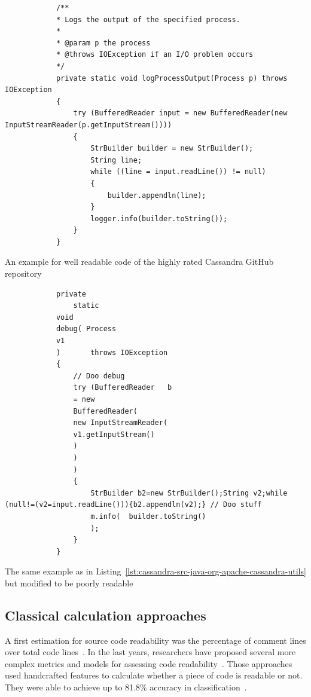 \documentclass[%
class=scrreprt,
chapterprefix=false,%
open=right,%
twoside=false,%
paper=a4,%
logofile={Logo\_zentral\_farbig\_EN.png},%
thesistype=masterproposal,%
UKenglish,%
]{se2thesis}
\begin{document}
	\begin{listing}[!ht]
		\begin{verbatim}
			/**
			* Logs the output of the specified process.
			*
			* @param p the process
			* @throws IOException if an I/O problem occurs
			*/
			private static void logProcessOutput(Process p) throws IOException
			{
				try (BufferedReader input = new BufferedReader(new InputStreamReader(p.getInputStream())))
				{
					StrBuilder builder = new StrBuilder();
					String line;
					while ((line = input.readLine()) != null)
					{
						builder.appendln(line);
					}
					logger.info(builder.toString());
				}
			}
		\end{verbatim}
		\caption[An example for well readable code of the highly rated Cassandra GitHub repository]{An example for well readable code of the highly rated Cassandra GitHub repository}
		\label{lst:cassandra-src-java-org-apache-cassandra-utils}
	\end{listing}
	
	\begin{listing}[!ht]
		\begin{verbatim}
			private 
				static 
			void 
			debug( Process 
			v1 
			)       throws IOException
			{
				// Doo debug
				try (BufferedReader   b 
				= new 
				BufferedReader(
				new InputStreamReader(
				v1.getInputStream()
				)
				)
				)
				{
					StrBuilder b2=new StrBuilder();String v2;while (null!=(v2=input.readLine())){b2.appendln(v2);} // Doo stuff
					m.info(  builder.toString()
					);
				}
			}
		\end{verbatim}
		\caption{The same example as in Listing~\ref{lst:cassandra-src-java-org-apache-cassandra-utils} but modified to be poorly readable}
		\label{lst:cassandra-src-java-org-apache-cassandra-utils-modified}
	\end{listing}
	
%	
%	
%	
	
	\subsection{Classical calculation approaches} \label{Classical calculation approaches}
	A first estimation for source code readability was the percentage of comment lines over total code lines~\cite{aggarwal2002integrated}. In the last years, researchers have proposed several more complex metrics and models for assessing code readability~\cite{buse2009learning, posnett2011simpler, dorn2012general, scalabrino2016improving}.
	Those approaches used handcrafted features to calculate whether a piece of code is readable or not. They were able to achieve up to 81.8\% accuracy in classification~\cite{scalabrino2016improving}.
	
\end{document}
